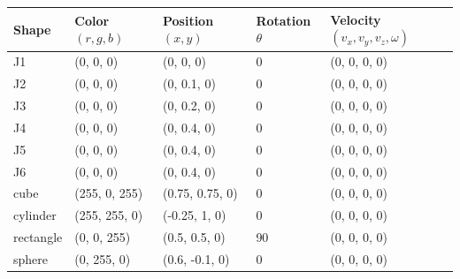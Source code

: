 \documentclass[doublespace,draft,nopageskip]{VTthesis} %
\begin{document}
	\begin{tiny}
		\begin{center}
			\begin{tabular}{ | m{2cm} | m{2cm}| m{2cm} | m{2cm} | m{3.25cm} |  }
				\hline
				\textbf{Shape} & \textbf{Color $(r, g, b)$} & \textbf{Position $(x,y)$} & \textbf{Rotation $\theta$} & \textbf{Velocity $(v_x, v_y, v_z, \omega)$} \\
				\hline
				J1 & (0, 0, 0) & (0, 0, 0) & 0\textdegree & (0, 0, 0, 0) \\ 
				\hline
				J2 & (0, 0, 0) & (0, 0.1, 0) & 0\textdegree & (0, 0, 0, 0) \\ 
				\hline
				J3 & (0, 0, 0) & (0, 0.2, 0) & 0\textdegree & (0, 0, 0, 0) \\ 
				\hline
				J4 & (0, 0, 0) & (0, 0.4, 0) & 0\textdegree & (0, 0, 0, 0) \\ 
				\hline
				J5 & (0, 0, 0) & (0, 0.4, 0) & 0\textdegree & (0, 0, 0, 0) \\ 
				\hline
				J6 & (0, 0, 0) & (0, 0.4, 0) & 0\textdegree & (0, 0, 0, 0) \\ 
				\hline
				cube & (255, 0, 255) & (0.75, 0.75, 0) & 0\textdegree & (0, 0, 0, 0) \\ 
				\hline
				cylinder & (255, 255, 0) & (-0.25, 1, 0) & 0\textdegree & (0, 0, 0, 0) \\ 
				\hline
				rectangle & (0, 0, 255) & (0.5, 0.5, 0) & 90\textdegree & (0, 0, 0, 0) \\ 
				\hline
				sphere & (0, 255, 0) & (0.6, -0.1, 0) & 0\textdegree & (0, 0, 0, 0) \\ 
				\hline
			\end{tabular}
		\end{center}
	\end{tiny}
\end{document}
